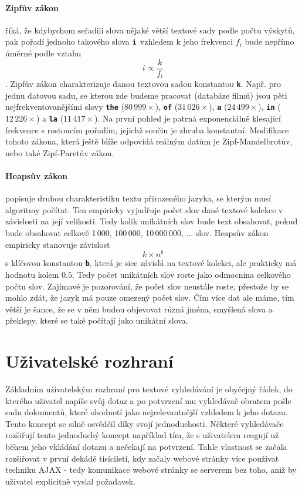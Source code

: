 \documentclass[11pt,letterpaper,oneside,openright]{book}
\newcommand{\bftt}[1]{\texttt{\textbf{#1}}}
\begin{document}
\paragraph{Zipfův zákon} říká, že kdybychom seřadili slova nějaké větší textové
sady podle počtu výskytů, pak pořadí jednoho takového slova $\bftt{i}$ vzhledem
k jeho frekvenci $f_i$ bude nepřímo úměrné podle vztahu \[i \propto
\frac{k}{f_i}\]. Zipfův zákon charakterizuje danou textovou sadou konstantou
\bftt{k}. Např. pro jednu datovou sadu, se kterou zde budeme pracovat (databáze
filmů) jsou pěti nejfrekventovanějšími slovy \bftt{the} ($80\,999\times$),
\bftt{of} ($31\,026\times$), \bftt{a} ($24\,499\times$), \bftt{in} ($12\,226
\times$) a \bftt{la} ($11\,417\times$). Na první pohled je patrná exponenciálně
klesající frekvence s rostoucím pořadím, jejichž součin je zhruba konstantní.
Modifikace tohoto zákona, která ještě blíže odpovídá reálným datům je
Zipf-Mandelbrotův, nebo také Zipf-Paretův zákon.

\paragraph{Heapsův zákon} popisuje druhou charakteristiku textu přirozeného
jazyka, se kterým musí algoritmy počítat. Ten empiricky vyjadřuje počet slov
dané textové kolekce v závislosti na její velikosti. Tedy kolik unikátních slov
bude text obsahovat, pokud bude obsahovat celkově 1\,000, 100\,000,
10\,000\,000, ... slov. Heapsův zákon empiricky stanovuje závislost \[k \times
n^b\] s klíčovou konstantou \bftt{b}, která je sice závislá na textové kolekci,
ale prakticky má hodnotu kolem $0.5$. Tedy počet unikátních slov roste jako
odmocnina celkového počtu slov. Zajímavé je pozorování, že počet slov neustále
roste, přestože by se mohlo zdát, že jazyk má pouze omezený počet slov. Čím
více dat ale máme, tím větší je šance, že se v něm budou objevovat různá jména,
smyšlená slova a překlepy, které se také počítají jako unikátní slova.

\section{Uživatelské rozhraní} \label{sec:uzivatelske_rozhrani}
Základním uživatelským rozhraní pro textové vyhledávání je obyčejný řádek, do
kterého uživatel napíše svůj dotaz a po potvrzení mu vyhledávač obratem pošle
sadu dokumentů, které ohodnotí jako nejrelevantnější vzhledem k jeho dotazu.
Tento koncept se silně osvědčil díky svojí jednoduchosti. Některé vyhledávače
rozšiřují tento jednoduchý koncept například tím, že s uživatelem reagují už
během jeho vkládání dotazu a nečekají na potvrzení. Tahle vlastnost se začala
rozšiřovat v první dekádě tisíciletí, kdy začaly webové stránky více používat
techniku AJAX - tedy komunikace webové stránky se serverem bez toho, aniž by
uživatel explicitně vyslal požadavek.
\end{document}
